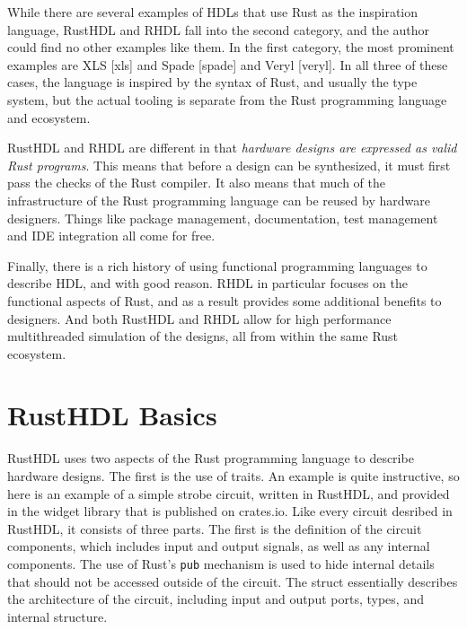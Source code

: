 \documentclass[conference]{IEEEtran}
\begin{document}
While there are several examples of HDLs that use Rust as the inspiration language, RustHDL and
RHDL fall into the second category, and the author could find no other examples like them.  In the 
first category, the most prominent examples are XLS [xls] and Spade [spade] and Veryl [veryl].  
In all three of these cases, the language is inspired by the syntax of Rust, and usually the type
system, but the actual tooling is separate from the Rust programming language and ecosystem.

RustHDL and RHDL are different in that \emph{hardware designs are expressed as valid Rust programs}.
This means that before a design can be synthesized, it must first pass the checks of the Rust
compiler.   It also means that much of the infrastructure of the Rust programming language can be reused
by hardware designers.  Things like package management, documentation, test management and IDE 
integration all come for free.

Finally, there is a rich history of using functional programming languages to describe HDL, and
with good reason.  RHDL in particular focuses on the functional aspects of Rust, and as a result 
provides some additional benefits to designers.  And both RustHDL and RHDL allow for high performance 
multithreaded simulation of the designs, all from within the same Rust ecosystem.

\section{RustHDL Basics}

RustHDL uses two aspects of the Rust programming language to describe hardware designs.  The first
is the use of traits.  An example is quite instructive, so here is an example of a simple strobe
circuit, written in RustHDL, and provided in the widget library that is published on crates.io.  Like 
every circuit desribed in RustHDL, it consists of three parts.  The first is the definition of the
circuit components, which includes input and output signals, as well as any internal components.
The use of Rust's \verb|pub| mechanism is used to hide internal details that should not be accessed
outside of the circuit.  The struct essentially describes the architecture of the circuit, including
input and output ports, types, and internal structure.
\end{document}
